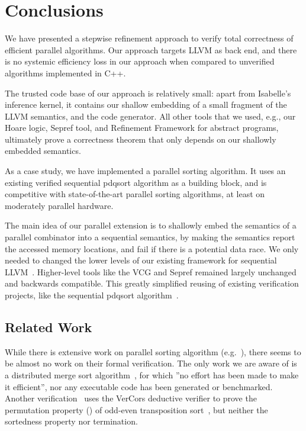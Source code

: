\documentclass[a4paper,UKenglish,cleveref, autoref, thm-restate]{lipics-v2021}
\begin{document}
  \section{Conclusions}\label{sec:concl}
    We have presented a stepwise refinement approach to verify total correctness of efficient parallel algorithms.
    Our approach targets LLVM as back end, and there is no systemic efficiency loss in our approach
    when compared to unverified algorithms implemented in C++.

    The trusted code base of our approach is relatively small:
    apart from Isabelle's inference kernel, it contains our shallow embedding of a small fragment of
    the LLVM semantics, and the code generator.
    All other tools that we used, e.g., our Hoare logic, Sepref tool, and Refinement Framework for abstract programs,
    ultimately prove a correctness theorem that only depends on our shallowly embedded semantics.

    As a case study, we have implemented a parallel sorting algorithm.
    It uses an existing verified sequential pdqsort algorithm as a building block,
    and is competitive with state-of-the-art parallel sorting algorithms,
    at least on moderately parallel hardware.

    The main idea of our parallel extension is to shallowly embed the semantics of a
    parallel combinator into a sequential semantics, by making the
    semantics report the accessed memory locations, and fail if there is a potential data race.
    We only needed to changed the lower levels of our existing framework for sequential LLVM~\cite{La19-llvm}.
    Higher-level tools like the VCG and Sepref remained largely unchanged and backwards compatible.
    This greatly simplified reusing of existing verification projects, like the sequential pdqsort algorithm~\cite{La20}.





    \subsection{Related Work}
    While there is extensive work on parallel sorting algorithm (e.g.~\cite{CNLM08,AMI21}),
    there seems to be almost no work on their formal verification. The only work we are aware of is
    a distributed merge sort algorithm~\cite{HKBK20}, for which ''no effort has been made to make it efficient''\cite[Sec.~2]{HKBK20},
    nor any executable code has been generated or benchmarked. Another verification~\cite{SaHu20} uses
    the VerCors deductive verifier to prove the permutation property ()
    of odd-even transposition sort~\cite{Ha72}, but neither the sortedness property nor termination.
\end{document}
